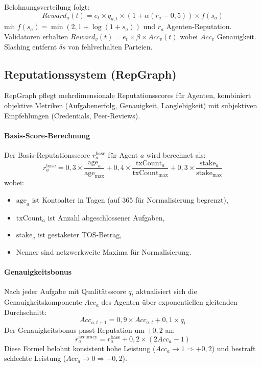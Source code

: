 \documentclass[11pt]{article}
\begin{document}
Belohnungsverteilung folgt:
\begin{equation}
Reward_a(t) = e_t \times q_{a,t} \times \left(1 + \alpha (r_a - 0,5)\right) \times f(s_a)
\end{equation}
mit $f(s_a) = \min(2, 1 + \log(1+s_a))$ und $r_a$ Agenten-Reputation. Validatoren erhalten $Reward_v(t) = e_t \times \beta \times Acc_v(t)$ wobei $Acc_v$ Genauigkeit. Slashing entfernt $\delta s$ von fehlverhalten Parteien.

\subsection{Reputationssystem (RepGraph)}
\label{sec:reputation}
RepGraph pflegt mehrdimensionale Reputationsscores für Agenten, kombiniert objektive Metriken (Aufgabenerfolg, Genauigkeit, Langlebigkeit) mit subjektiven Empfehlungen (Credentials, Peer-Reviews).

\paragraph{Basis-Score-Berechnung} Der Basis-Reputationsscore $r_a^{\text{base}}$ für Agent $a$ wird berechnet als:
\begin{equation}
r_a^{\text{base}} = 0,3 \times \frac{\text{age}_a}{\text{age}_{\max}} + 0,4 \times \frac{\text{txCount}_a}{\text{txCount}_{\max}} + 0,3 \times \frac{\text{stake}_a}{\text{stake}_{\max}}
\end{equation}
wobei:
\begin{itemize}[noitemsep]
  \item $\text{age}_a$ ist Kontoalter in Tagen (auf 365 für Normalisierung begrenzt),
  \item $\text{txCount}_a$ ist Anzahl abgeschlossener Aufgaben,
  \item $\text{stake}_a$ ist gestaketer TOS-Betrag,
  \item Nenner sind netzwerkweite Maxima für Normalisierung.
\end{itemize}

\paragraph{Genauigkeitsbonus} Nach jeder Aufgabe mit Qualitätsscore $q_t$ aktualisiert sich die Genauigkeitskomponente $Acc_a$ des Agenten über exponentiellen gleitenden Durchschnitt:
\begin{equation}
Acc_{a,t+1} = 0,9 \times Acc_{a,t} + 0,1 \times q_t
\end{equation}
Der Genauigkeitsbonus passt Reputation um $\pm 0,2$ an:
\begin{equation}
r_a^{\text{accuracy}} = r_a^{\text{base}} + 0,2 \times (2 Acc_a - 1)
\end{equation}
Diese Formel belohnt konsistent hohe Leistung ($Acc_a \to 1 \Rightarrow +0,2$) und bestraft schlechte Leistung ($Acc_a \to 0 \Rightarrow -0,2$).
\end{document}
